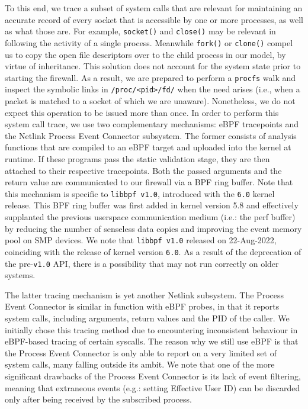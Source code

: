 To this end, we trace a subset of system calls that are relevant for maintaining an accurate record of every socket that is accessible by one or more processes, as well as what those are. For example, \texttt{socket()} and \texttt{close()} may be relevant in following the activity of a single process. Meanwhile \texttt{fork()} or \texttt{clone()} compel us to copy the open file descriptors over to the child process in our model, by virtue of inheritance. This solution does not account for the system state prior to starting the firewall. As a result, we are prepared to perform a \texttt{procfs} walk and inspect the symbolic links in \texttt{/proc/<pid>/fd/} when the need arises (i.e., when a packet is matched to a socket of which we are unaware). Nonetheless, we do not expect this operation to be issued more than once. In order to perform this system call trace, we use two complementary mechanisms: eBPF tracepoints and the Netlink Process Event Connector subsystem. The former consists of analysis functions that are compiled to an eBPF target and uploaded into the kernel at runtime. If these programs pass the static validation stage, they are then attached to their respective tracepoints. Both the passed arguments and the return value are communicated to our firewall via a BPF ring buffer. Note that this mechanism is specific to \texttt{libbpf v1.0}, introduced with the \texttt{6.0} kernel release. This BPF ring buffer was first added in kernel version 5.8 and effectively supplanted the previous userspace communication medium (i.e.: the perf buffer) by reducing the number of senseless data copies and improving the event memory pool on SMP devices. We note that \texttt{libbpf v1.0} released on 22-Aug-2022, coinciding with the release of kernel version \texttt{6.0}. As a result of the deprecation of the pre-\texttt{v1.0} API, there is a possibility that \daf{} may not run correctly on older systems.

The latter tracing mechanism is yet another Netlink subsystem. The Process Event Connector is similar in function with eBPF probes, in that it reports system calls, including arguments, return values and the PID of the caller. We initially chose this tracing method due to encountering inconsistent behaviour in eBPF-based tracing of certain syscalls. The reason why we still use eBPF is that the Process Event Connector is only able to report on a very limited set of system calls, many falling outside its ambit. We note that one of the more significant drawbacks of the Process Event Connector is its lack of event filtering, meaning that extraneous events (e.g.: setting Effective User ID) can be discarded only after being received by the subscribed process.


